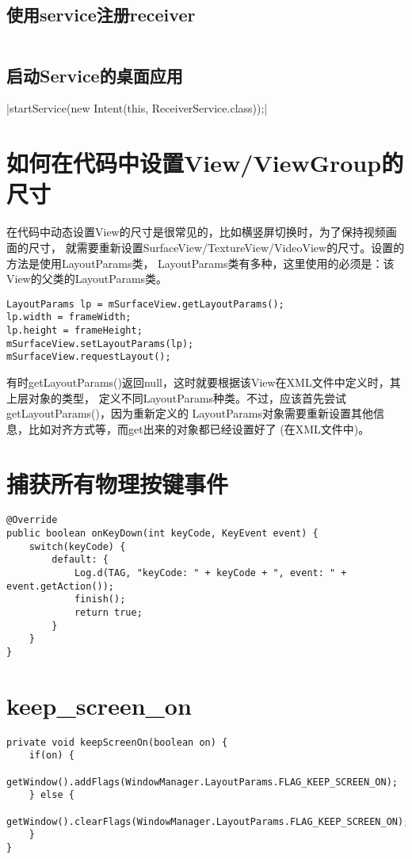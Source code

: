 ﻿\documentclass[a4paper,11pt]{article}
\begin{document}
  \subsection[使用service注册receiver]{使用service注册receiver}
  \inputminted[linenos,tabsize=4,bgcolor=srcbg]{java}{ReceiverService.java}

  \subsection[启动Service的桌面应用]{启动Service的桌面应用}
  |startService(new Intent(this, ReceiverService.class));|


  \section[如何在代码中设置View/ViewGroup的尺寸]{如何在代码中设置View/ViewGroup的尺寸}
  在代码中动态设置View的尺寸是很常见的，比如横竖屏切换时，为了保持视频画面的尺寸，
  就需要重新设置SurfaceView/TextureView/VideoView的尺寸。设置的方法是使用LayoutParams类，
  LayoutParams类有多种，这里使用的必须是：该View的父类的LayoutParams类。

\begin{verbatim}
LayoutParams lp = mSurfaceView.getLayoutParams();
lp.width = frameWidth;
lp.height = frameHeight;
mSurfaceView.setLayoutParams(lp);
mSurfaceView.requestLayout();
\end{verbatim}

  有时getLayoutParams()返回null，这时就要根据该View在XML文件中定义时，其上层对象的类型，
  定义不同LayoutParams种类。不过，应该首先尝试getLayoutParams()，因为重新定义的
  LayoutParams对象需要重新设置其他信息，比如对齐方式等，而get出来的对象都已经设置好了
  (在XML文件中)。

  \section[捕获所有物理按键事件]{捕获所有物理按键事件}
  \begin{verbatim}
@Override
public boolean onKeyDown(int keyCode, KeyEvent event) {
    switch(keyCode) {
        default: {
            Log.d(TAG, "keyCode: " + keyCode + ", event: " + event.getAction());
            finish();
            return true;
        }
    }
}
  \end{verbatim}

  \section[keep\_screen\_on]{keep\_screen\_on}
  \begin{verbatim}
private void keepScreenOn(boolean on) {
    if(on) {
        getWindow().addFlags(WindowManager.LayoutParams.FLAG_KEEP_SCREEN_ON);
    } else {
        getWindow().clearFlags(WindowManager.LayoutParams.FLAG_KEEP_SCREEN_ON);
    }
}
  \end{verbatim}
\end{document}

